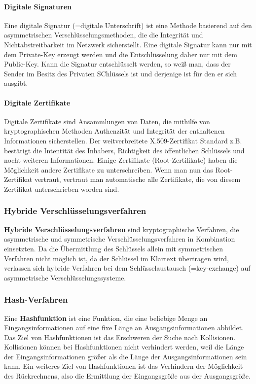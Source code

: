 \documentclass[12pt,a4paper]{report}
\begin{document}
\begin{onehalfspace}
\paragraph{Digitale Signaturen}

Eine digitale Signatur (=digitale Unterschrift) ist eine Methode basierend auf den asymmetrischen Verschlüsselungsmethoden, die die Integrität und Nichtabstreitbarkeit im Netzwerk sicherstellt. Eine digitale Signatur kann nur mit dem Private-Key erzeugt werden und die Entschlüsselung daher nur mit dem Public-Key. Kann die Signatur entschlüsselt werden, so weiß man, dass der Sender im Besitz des Privaten SChlüssels ist und derjenige ist für den er sich ausgibt. \cite{wiki03}

\paragraph{Digitale Zertifikate}

Digitale Zertifikate sind Ansammlungen von Daten, die mithilfe von kryptographischen Methoden Authenzität und Integrität der enthaltenen Informationen sicherstellen. Der weitverbreitete X.509-Zertifikat Standard z.B. bestätigt die Intentität des Inhabers, Richtigkeit des öffentlichen Schlüssels und nocht weiteren Informationen. Einige Zertifikate (Root-Zertifikate) haben die Möglichkeit andere Zertifikate zu unterschreiben. Wenn man nun das Root-Zertifikat vertraut, vertraut man automatische alle Zertifikate, die von diesem Zertifikat unterschrieben worden sind.

\subsubsection{Hybride Verschlüsselungsverfahren}

\textbf{Hybride Verschlüsselungsverfahren} sind kryptographische Verfahren, die asymmetrische und symmetrische Verschlüsselungsverfahren in Kombination einsetzten. Da die Übermittlung des Schlüssels allein mit symmetrischen Verfahren nicht möglich ist, da der Schlüssel im Klartext übertragen wird, verlassen sich hybride Verfahren bei dem Schlüsselaustausch (=key-exchange) auf asymmetrische Verschlüsselungssysteme.

\subsubsection{Hash-Verfahren}

Eine \textbf{Hashfunktion} ist eine Funktion, die eine beliebige Menge an Eingangsinformationen auf eine fixe Länge an Ausgangsinformationen abbildet.  Das Ziel von Hashfunktionen ist das Erschweren der Suche nach Kollisionen. Kollisionen können bei Hashfunktionen nicht verhindert werden, weil die Länge der Eingangsinformationen größer als die Länge der Ausgangsinformationen sein kann. Ein weiteres Ziel von Hashfunktionen ist das Verhindern der Möglichkeit des Rückrechnens, also die Ermittlung der Eingangsgröße aus der Ausgangsgröße.\cite{wiki04}


\end{onehalfspace}
\end{document}
